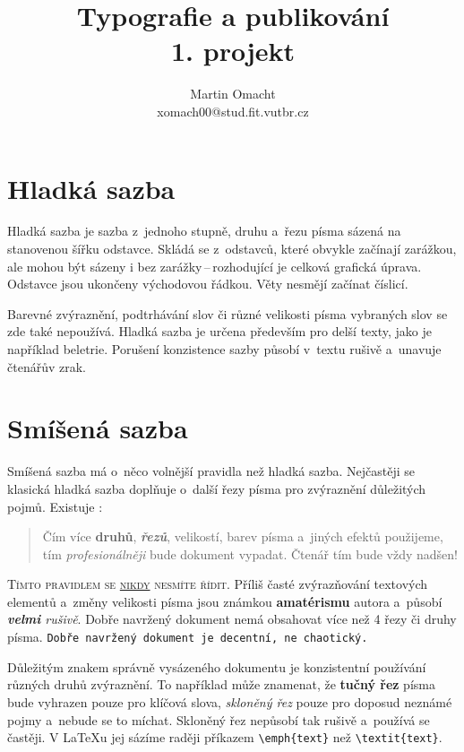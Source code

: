 \documentclass[11pt,a4paper,twocolumn]{article}[25.02.2017]
\begin{document}
	\title{\LARGE Typografie a publikování\\1. projekt}
	
	\author{Martin Omacht\\xomach00@stud.fit.vutbr.cz}
	\date{}
	
	\maketitle
		
	\section {Hladká sazba}
	
	Hladká sazba je sazba z~jednoho stupně, druhu a~řezu písma sázená na stanovenou šířku odstavce. Skládá se z~odstavců, které obvykle začínají zarážkou, ale mohou být sázeny i bez zarážky\,--\,rozhodující je celková grafická úprava. Odstavce jsou ukončeny východovou řádkou. Věty nesmějí začínat číslicí.
	
	Barevné zvýraznění, podtrhávání slov či různé velikosti písma vybraných slov se zde také nepoužívá. Hladká sazba je určena především pro delší texty, jako je například beletrie. Porušení konzistence sazby působí v~textu rušivě a~unavuje čtenářův zrak.
	
	\section{Smíšená sazba}
	
	Smíšená sazba má o~něco volnější pravidla než hladká sazba. Nejčastěji se klasická hladká sazba doplňuje o~další řezy písma pro zvýraznění důležitých pojmů. Existuje :

	\begin{quotation}
	Čím více \textbf{druhů}, \textbf{\emph{řezů}}, {\scriptsize velikostí}, barev pí\-sma a~jiných efektů použijeme, tím \emph {pro\-fe\-sio\-nálněji} bude dokument vypadat. Čtenář tím bude vždy {\Huge nadšen!}
	\end{quotation}
	
	\textsc {Tímto pravidlem se \underline {nikdy} nesmíte řídit.} Příliš časté zvýrazňování textových elementů a~změny velikosti {\tiny písma} jsou {\Large známkou} \textbf{\huge amatéris\-mu} autora a~působí \emph{\textbf{velmi} rušivě}. Dobře navržený dokument nemá obsahovat více než 4 řezy či druhy písma. \texttt{Dobře navržený dokument je decentní, ne chaotický.}
	
	Důležitým znakem správně vysázeného dokumentu je konzistentní používání různých druhů zvýraznění. To například může znamenat, že \textbf{tučný řez} písma bude vyhrazen pouze pro klíčová slova, \emph{skloněný řez} pouze pro doposud neznámé pojmy a~nebude se to míchat. Skloněný řez nepůsobí tak rušivě a~používá se častěji. V \LaTeX u jej sázíme raději příkazem \verb|\emph{text}| než \verb|\textit{text}|.
	
\end{document}
